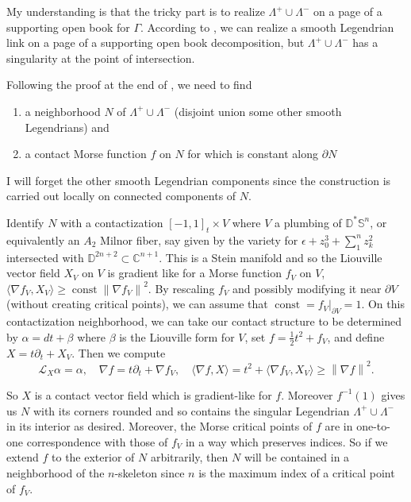 \documentclass[11pt]{amsart}
\DeclareMathOperator{\const}{const}
\newcommand{\C}{\mathbb{C}}
\newcommand{\disk}{\mathbb{D}}
\newcommand{\grad}{\nabla}
\newcommand{\Lie}{\mathcal{L}}
\newcommand{\half}{\frac{1}{2}}
\newcommand{\be}{\begin{enumerate}}
\newcommand{\ee}{\end{enumerate}}
\newcommand{\norm}[1]{\left\lVert#1\right\rVert}
\newcommand{\sphere}{\mathbb{S}}
\newcommand{\Leg}{\Lambda}
\newcommand{\posLeg}{\Leg^{+}}
\newcommand{\negLeg}{\Leg^{-}}
\newcommand{\divSet}{\Gamma}
\begin{document}
My understanding is that the tricky part is to realize $\posLeg \cup \negLeg$ on a page of a supporting open book for $\divSet$. According to \cite[Corollary 1.3.3]{HH:Convex}, we can realize a smooth Legendrian link on a page of a supporting open book decomposition, but $\posLeg \cup \negLeg$ has a singularity at the point of intersection.

Following the proof at the end of \cite[\S 10]{HH:Convex}, we need to find 
\be
\item a neighborhood $N$ of $\posLeg \cup \negLeg$ (disjoint union some other smooth Legendrians) and
\item a contact Morse function $f$ on $N$ for which is constant along $\partial N$
\ee
I will forget the other smooth Legendrian components since the construction is carried out locally on connected components of $N$.

Identify $N$ with a contactization $[-1, 1]_{t} \times V$ where $V$ a plumbing of $\disk^{\ast}\sphere^{n}$, or equivalently an $A_{2}$ Milnor fiber, say given by the variety for $\epsilon + z_{0}^{3} + \sum_{1}^{n}z_{k}^{2}$ intersected with $\disk^{2n+2} \subset \C^{n+1}$. This is a Stein manifold and so the Liouville vector field $X_{V}$ on $V$ is gradient like for a Morse function $f_{V}$ on $V$, $\langle \grad f_{V}, X_{V} \rangle \geq \const \norm{ \grad f_{V}}^{2}$. By rescaling $f_{V}$ and possibly modifying it near $\partial V$ (without creating critical points), we can assume that $\const = f_{V}|_{\partial V} = 1$. On this contactization neighborhood, we can take our contact structure to be determined by $\alpha = dt + \beta$ where $\beta$ is the Liouville form for $V$, set $f = \half t^{2} + f_{V}$, and define $X = t\partial_{t} + X_{V}$. Then we compute
\begin{equation*}
\Lie_{X}\alpha = \alpha, \quad \grad f = t\partial_{t} + \grad f_{V}, \quad \langle \grad f, X\rangle = t^{2} + \langle \grad f_{V}, X_{V} \rangle \geq \norm{\grad f}^{2}.
\end{equation*}

So $X$ is a contact vector field which is gradient-like for $f$. Moreover $f^{-1}(1)$ gives us $N$ with its corners rounded and so contains the singular Legendrian $\posLeg \cup \negLeg$ in its interior as desired. Moreover, the Morse critical points of $f$ are in one-to-one correspondence with those of $f_{V}$ in a way which preserves indices. So if we extend $f$ to the exterior of $N$ arbitrarily, then $N$ will be contained in a neighborhood of the $n$-skeleton since $n$ is the maximum index of a critical point of $f_{V}$.
\end{document}
